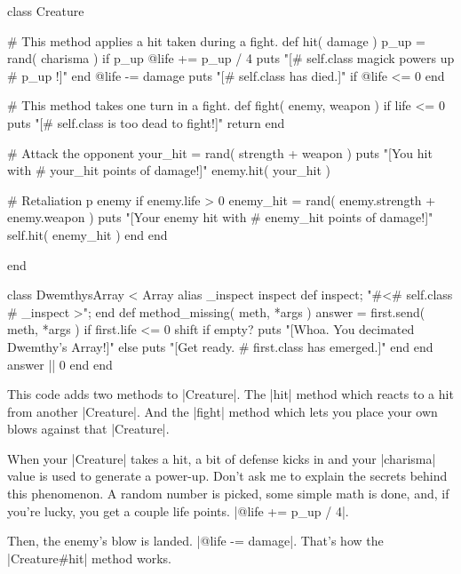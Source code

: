 \documentclass[12pt,twoside]{report}
\begin{document}
\begin{rubycode}

 class Creature

   # This method applies a hit taken during a fight.
   def hit( damage )
     p_up = rand( charisma )
     if p_up %
       @life += p_up / 4
       puts "[#{ self.class } magick powers up #{ p_up }!]"
     end
     @life -= damage
     puts "[#{ self.class } has died.]" if @life <= 0
   end

   # This method takes one turn in a fight.
   def fight( enemy, weapon )
     if life <= 0
       puts "[#{ self.class } is too dead to fight!]"
       return
     end

     # Attack the opponent
     your_hit = rand( strength + weapon )
     puts "[You hit with #{ your_hit } points of damage!]"
     enemy.hit( your_hit )

     # Retaliation
     p enemy
     if enemy.life > 0
       enemy_hit = rand( enemy.strength + enemy.weapon )
       puts "[Your enemy hit with #{ enemy_hit } points of damage!]"
       self.hit( enemy_hit )
     end
   end

 end

 class DwemthysArray < Array
   alias _inspect inspect
   def inspect; "#<#{ self.class }#{ _inspect }>"; end
   def method_missing( meth, *args )
     answer = first.send( meth, *args )
     if first.life <= 0
       shift
       if empty?
         puts "[Whoa.  You decimated Dwemthy's Array!]"
       else
         puts "[Get ready. #{ first.class } has emerged.]"
       end
     end
     answer || 0
   end
 end

\end{rubycode}


This code adds two methods to \rubyinline|Creature|.
The \rubyinline|hit| method which reacts to a hit from
another \rubyinline|Creature|.  And the
\rubyinline|fight| method which lets you place your
own blows against that \rubyinline|Creature|.

When your \rubyinline|Creature| takes a hit, a bit of
defense kicks in and your \rubyinline|charisma| value
is used to generate a power-up.  Don't ask me to explain the secrets
behind this phenomenon.  A random number is picked, some simple math
is done, and, if you're lucky, you get a couple life points.
\rubyinline|@life += p_up / 4|.

Then, the enemy's blow is landed.  
\rubyinline|@life -= damage|.  
That's how the \rubyinline|Creature#hit|
method works.
\end{document}
